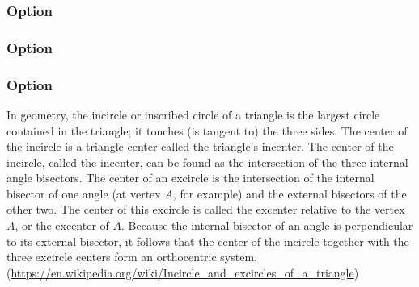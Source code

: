 \begin{tkzexample}[latex=5cm,small]
\end{tkzexample}

\subsubsection{Option }
\begin{tkzexample}[latex=5cm,small]
\end{tkzexample}

\subsubsection{Option }
\begin{tkzexample}[latex=6cm,small]
\end{tkzexample}

\subsubsection{Option }
In geometry, the incircle or inscribed circle of a triangle is the largest circle contained in the triangle; it touches (is tangent to) the three sides. The center of the incircle is a triangle center called the triangle's incenter.
The center of the incircle, called the incenter, can be found as the intersection of the three internal angle bisectors. The center of an excircle is the intersection of the internal bisector of one angle (at vertex $A$, for example) and the external bisectors of the other two. The center of this excircle is called the excenter relative to the vertex $A$, or the excenter of $A$. Because the internal bisector of an angle is perpendicular to its external bisector, it follows that the center of the incircle together with the three excircle centers form an orthocentric system.(\url{https://en.wikipedia.org/wiki/Incircle_and_excircles_of_a_triangle})


